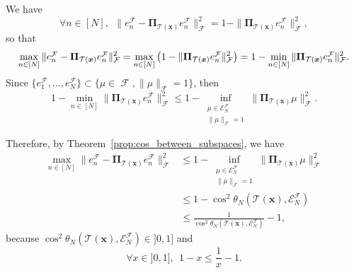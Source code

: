 \documentclass[twoside,11pt]{book}
\numberwithin{theorem}{chapter}
\numberwithin{definition}{chapter}
\numberwithin{proposition}{chapter}
\numberwithin{corollary}{chapter}
\numberwithin{example}{chapter}
\numberwithin{lemma}{chapter}
\numberwithin{assumption}{chapter}
\DeclareMathOperator{\F}{\mathcal{F}}
\begin{document}
We have
\begin{equation}
\forall n \in [N], \:\:\|e_{n}^{\F} - \bm{\Pi}_{\mathcal{T}(\bm{x})} e_{n}^{\F} \|_{\mathcal{F}}^{2} = 1-\|\bm{\Pi}_{\mathcal{T}(\bm{x})} e_{n}^{\F} \|_{\mathcal{F}}^{2},
\end{equation}
so that
\begin{equation}
\max_{ n \in [N]} \|e_{n}^{\F} - \bm{\Pi}_{\mathcal{T}(\bm{x})} e_{n}^{\F}\|_{\mathcal{F}}^{2} = \max_{ n \in [N]} \big(1 - \|\bm{\Pi}_{\mathcal{T}(\bm{x})} e_{n}^{\F}\|_{\mathcal{F}}^{2}\big) \\
 = 1-\min_{ n \in [N]} \|\bm{\Pi}_{\mathcal{T}(\bm{x})} e_{n}^{\F}\|_{\mathcal{F}}^{2}.
\end{equation}
Since $\{e_{1}^{\F}, \dots, e_{N}^{\F} \} \subset \{ \mu \in \F, \|\mu\|_{\F} = 1 \}$, then
\begin{equation}
1-\min_{ n \in [N]} \|\bm{\Pi}_{\mathcal{T}(\bm{x})} e_{n}^{\F}\|_{\mathcal{F}}^{2} \leq 1-\inf_{\substack{\mu \in \mathcal{E}_{N}^{\mathcal{F}}\\ \|\mu\|_{\mathcal{F}}=1}} \|\bm{\Pi}_{\mathcal{T}(\bm{x})} \mu\|_{\mathcal{F}}^{2}.
\end{equation}


Therefore, by Theorem~\ref{prop:cos_between_subspaces}, we have
\begin{align}\label{eq:max_error_as_function_of_cos_proof}
	\max_{ n \in [N]} \|e_{n}^{\F} - \bm{\Pi}_{\mathcal{T}(\bm{x})} e_{n}^{\F}\|_{\mathcal{F}}^{2} & \leq 1-\inf_{\substack{\mu \in \mathcal{E}_{N}^{\mathcal{F}}\\ \|\mu\|_{\mathcal{F}}=1}} \|\bm{\Pi}_{\mathcal{T}(\bm{x})} \mu\|_{\mathcal{F}}^{2}\\
	& \leq 1-\cos^{2} \theta_{N}(\mathcal{T}(\bm{x}),\mathcal{E}^{\mathcal{F}}_{N})\\
	& \leq \frac{1}{\cos^{2} \theta_{N}(\mathcal{T}(\bm{x}),\mathcal{E}^{\mathcal{F}}_{N})} - 1,
\end{align}
because $\cos^{2} \theta_{N}(\mathcal{T}(\bm{x}),\mathcal{E}^{\mathcal{F}}_{N}) \in ]0,1]$ and 
\begin{equation}
\forall x \in ]0,1], \:\: 1-x \leq \frac{1}{x}-1.
\end{equation}
\end{document}
